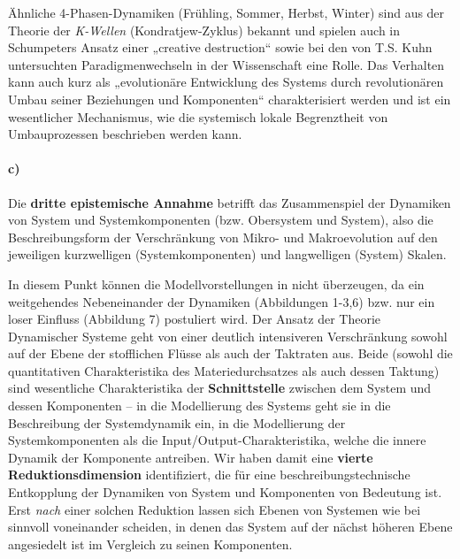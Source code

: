 \documentclass[11pt,a4paper]{article}
\begin{document}
Ähnliche 4-Phasen-Dynamiken (Frühling, Sommer, Herbst, Winter) sind aus der
Theorie der \emph{K-Wellen} (Kondratjew-Zyklus) bekannt und spielen auch in
Schumpeters Ansatz einer „creative destruction“ sowie bei den von T.S. Kuhn
untersuchten Paradigmenwechseln in der Wissenschaft eine Rolle. Das Verhalten
kann auch kurz als „evolutionäre Entwicklung des Systems durch revolutionären
Umbau seiner Beziehungen und Komponenten“ charakterisiert werden und ist ein
wesentlicher Mechanismus, wie die systemisch lokale Begrenztheit von
Umbauprozessen beschrieben werden kann.

\paragraph{c)}
Die \textbf{dritte epistemische Annahme} betrifft das Zusammenspiel der
Dynamiken von System und Systemkomponenten (bzw.  Obersystem und System), also
die Beschreibungsform der Verschränkung von Mikro- und Makroevolution auf den
jeweiligen kurzwelligen (Systemkomponenten) und langwelligen (System) Skalen.

In diesem Punkt können die Modellvorstellungen in \cite{Holling2000} nicht
überzeugen, da ein weitgehendes Nebeneinander der Dynamiken (Abbildungen
1-3,6) bzw. nur ein loser Einfluss (Abbildung 7) postuliert wird. Der Ansatz
der Theorie Dynamischer Systeme geht von einer deutlich intensiveren
Verschränkung sowohl auf der Ebene der stoff\-lichen Flüsse als auch der
Takt\-raten aus. Beide (sowohl die quantitativen Charakteristika des
Materiedurchsatzes als auch dessen Taktung) sind wesentliche Charakteristika
der \textbf{Schnittstelle} zwischen dem System und dessen Komponenten -- in
die Modellierung des Systems geht sie in die Beschreibung der Systemdynamik
ein, in die Modellierung der Systemkomponenten als die
Input/Output-Charakteristika, welche die innere Dynamik der Komponente
antreiben. Wir haben damit eine \textbf{vierte Reduktionsdimension}
identifiziert, die für eine beschreibungstechnische Entkopplung der Dynamiken
von System und Komponenten von Bedeutung ist. Erst \emph{nach} einer solchen
Reduktion lassen sich Ebenen von Systemen wie bei \cite{Holling2000} sinnvoll
voneinander scheiden, in denen das System auf der nächst höheren Ebene
angesiedelt ist im Vergleich zu seinen Komponenten.
\end{document}

